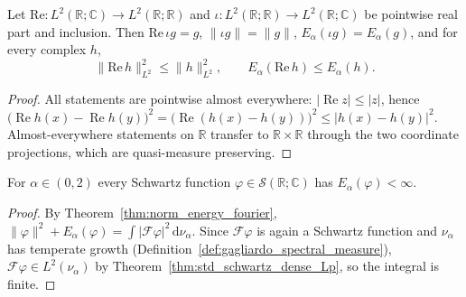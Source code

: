 \begin{lemma}\label{lem:real_part_contraction}
\leanok
Let $\mathrm{Re} : L^2(\mathbb{R}; \mathbb{C}) \to L^2(\mathbb{R}; \mathbb{R})$ and $\iota : L^2(\mathbb{R}; \mathbb{R}) \to L^2(\mathbb{R}; \mathbb{C})$ be pointwise real part and inclusion. Then $\mathrm{Re}\, \iota g = g$, $\lVert \iota g \rVert = \lVert g \rVert$, $E_\alpha(\iota g) = E_\alpha(g)$, and for every complex $h$,
\[
  \lVert \mathrm{Re}\, h \rVert_{L^2}^2 \le \lVert h \rVert_{L^2}^2, \qquad E_\alpha(\mathrm{Re}\, h) \le E_\alpha(h).
\]
\end{lemma}

\begin{proof}
\leanok
All statements are pointwise almost everywhere: $\lvert \operatorname{Re} z \rvert \le \lvert z \rvert$, hence $\bigl(\operatorname{Re} h(x) - \operatorname{Re} h(y)\bigr)^2 = \bigl(\operatorname{Re}(h(x) - h(y))\bigr)^2 \le \lvert h(x) - h(y) \rvert^2$. Almost-everywhere statements on $\mathbb{R}$ transfer to $\mathbb{R} \times \mathbb{R}$ through the two coordinate projections, which are quasi-measure preserving.
\end{proof}

\begin{lemma}\label{lem:schwartz_finite_energy}
\leanok
For $\alpha \in (0, 2)$ every Schwartz function $\varphi \in \mathcal{S}(\mathbb{R}; \mathbb{C})$ has $E_\alpha(\varphi) < \infty$.
\end{lemma}

\begin{proof}
\leanok
By Theorem~\ref{thm:norm_energy_fourier}, $\lVert \varphi \rVert^2 + E_\alpha(\varphi) = \int \lvert \mathcal{F}\varphi \rvert^2 \, \mathrm{d}\nu_\alpha$. Since $\mathcal{F}\varphi$ is again a Schwartz function and $\nu_\alpha$ has temperate growth (Definition~\ref{def:gagliardo_spectral_measure}), $\mathcal{F}\varphi \in L^2(\nu_\alpha)$ by Theorem~\ref{thm:std_schwartz_dense_Lp}, so the integral is finite.
\end{proof}

